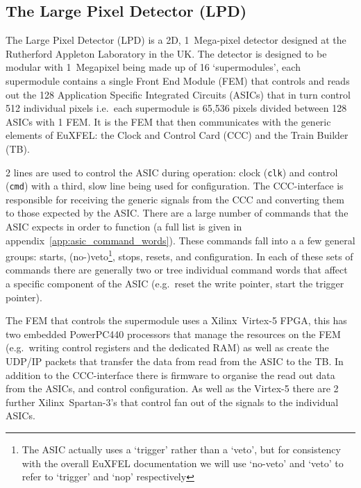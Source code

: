 \subsection{The Large Pixel Detector (LPD)} %
\label{sub:the_large_pixel_detector_lpd}
The Large Pixel Detector (LPD) is a 2D, 1~Mega-pixel detector designed at the Rutherford Appleton Laboratory in the UK. The detector is designed to be modular with 1~Megapixel being made up of 16 `supermodules', each supermodule contains a single Front End Module (FEM) that controls and reads out the 128 Application Specific Integrated Circuits (ASICs) that in turn control 512 individual pixels i.e.\ each supermodule is 65,536 pixels divided between 128 ASICs with 1 FEM. It is the FEM that then communicates with the generic elements of EuXFEL: the Clock and Control Card (CCC) and the Train Builder (TB).
    
2 lines are used to control the ASIC during operation: clock (\texttt{clk}) and control (\texttt{cmd}) with a third, slow line being used for configuration. The CCC-interface is responsible for receiving the generic signals from the CCC and converting them to those expected by the ASIC. There are a large number of commands that the ASIC expects in order to function (a full list is given in appendix~\ref{app:asic_command_words}). These commands fall into a a few general groups: starts, (no-)veto\footnote{The ASIC actually uses a `trigger' rather than a `veto', but for consistency with the overall EuXFEL documentation we will use `no-veto' and `veto' to refer to `trigger' and `nop' respectively}, stops, resets, and configuration. In each of these sets of commands there are generally two or tree individual command words that affect a specific component of the ASIC (e.g.\ reset the write pointer, start the trigger pointer). 

    
The FEM that controls the supermodule uses a Xilinx~Virtex-5 FPGA, this has two embedded PowerPC440 processors that manage the resources on the FEM (e.g.\ writing control registers and the dedicated RAM) as well as create the UDP/IP packets that transfer the data from read from the ASIC to the TB. In addition to the CCC-interface there is firmware to organise the read out data from the ASICs, and control configuration. As well as the Virtex-5 there are 2 further Xilinx~Spartan-3's that control fan out of the signals to the individual ASICs.

